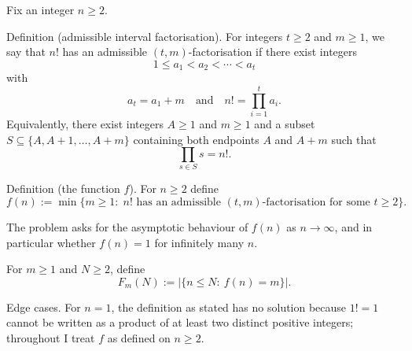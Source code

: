 Fix an integer $n\ge 2$.

Definition (admissible interval factorisation).
For integers $t\ge 2$ and $m\ge 1$, we say that $n!$ has an admissible $(t,m)$-factorisation if there exist integers
\[
1\le a_1 < a_2 < \cdots < a_t
\]
with
\[
a_t=a_1+m\quad\text{and}\quad n! = \prod_{i=1}^t a_i.
\]
Equivalently, there exist integers $A\ge 1$ and $m\ge 1$ and a subset $S\subseteq\{A,A+1,\dots,A+m\}$ containing both endpoints $A$ and $A+m$ such that
\[
\prod_{s\in S} s = n!.
\]

Definition (the function $f$).
For $n\ge 2$ define
\[
f(n):=\min\{m\ge 1:\; n!\text{ has an admissible }(t,m)\text{-factorisation for some }t\ge 2\}.
\]

The problem asks for the asymptotic behaviour of $f(n)$ as $n\to\infty$, and in particular whether $f(n)=1$ for infinitely many $n$.

For $m\ge 1$ and $N\ge 2$, define
\[
F_m(N):=|\{n\le N:\ f(n)=m\}|.
\]

Edge cases.
For $n=1$, the definition as stated has no solution because $1!=1$ cannot be written as a product of at least two distinct positive integers; throughout I treat $f$ as defined on $n\ge 2$.
